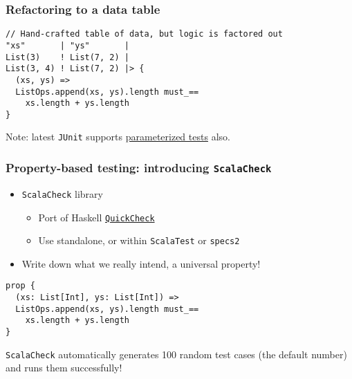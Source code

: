 \begin{frame}[fragile]
  \frametitle{Refactoring to a data table}

  \begin{verbatim}
// Hand-crafted table of data, but logic is factored out
"xs"       | "ys"       |
List(3)    ! List(7, 2) |
List(3, 4) ! List(7, 2) |> {
  (xs, ys) =>
  ListOps.append(xs, ys).length must_==
    xs.length + ys.length
}
  \end{verbatim}

  Note: latest \texttt{JUnit} supports \href{https://github.com/junit-team/junit/wiki/Parameterized-tests}{parameterized tests} also.
\end{frame}

\begin{frame}[fragile]
  \frametitle{Property-based testing: introducing \texttt{ScalaCheck}}

  \begin{itemize}
    \item \texttt{ScalaCheck} library
      \begin{itemize}
        \item Port of Haskell \href{http://en.wikipedia.org/wiki/QuickCheck}{\texttt{QuickCheck}}
        \item Use standalone, or within \texttt{ScalaTest} or \texttt{specs2}
      \end{itemize}
    \item Write down what we really intend, a universal property!
  \end{itemize}

  \begin{verbatim}
prop {
  (xs: List[Int], ys: List[Int]) =>
  ListOps.append(xs, ys).length must_==
    xs.length + ys.length
}
  \end{verbatim}

  \texttt{ScalaCheck} automatically generates 100 random test cases (the default number) and runs them successfully!

\end{frame}

